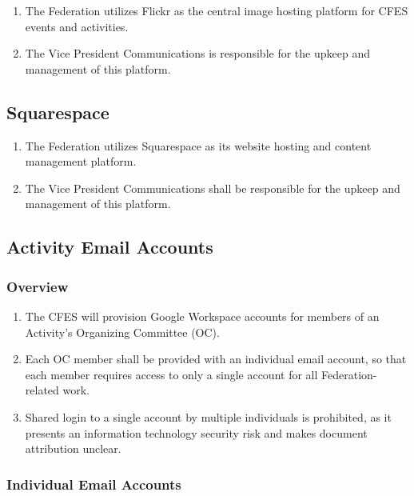 \begin{enumerate}
 \item
  The Federation utilizes Flickr as the central image hosting platform for CFES events and activities.
 \item
  The Vice President Communications is responsible for the upkeep and management of this platform.
\end{enumerate}

\subsection{Squarespace}
\label{squarespace}

\begin{enumerate}
 \item
  The Federation utilizes Squarespace as its website hosting and content management platform.
 \item
  The Vice President Communications shall be responsible for the upkeep and management of this platform.
\end{enumerate}

\subsection{Activity Email Accounts}
\label{activity-email-accounts}

\subsubsection{Overview}
\label{activity-email-overview}

\begin{enumerate}
 \item
  The CFES will provision Google Workspace accounts for members of an Activity's Organizing Committee (OC).
 \item
  Each OC member shall be provided with an individual email account, so that each member requires access to only a single account for all Federation-related work.
 \item
  Shared login to a single account by multiple individuals is prohibited, as it presents an information technology security risk and makes document attribution unclear.
\end{enumerate}

\subsubsection{Individual Email Accounts}
\label{individual-email-accounts}

